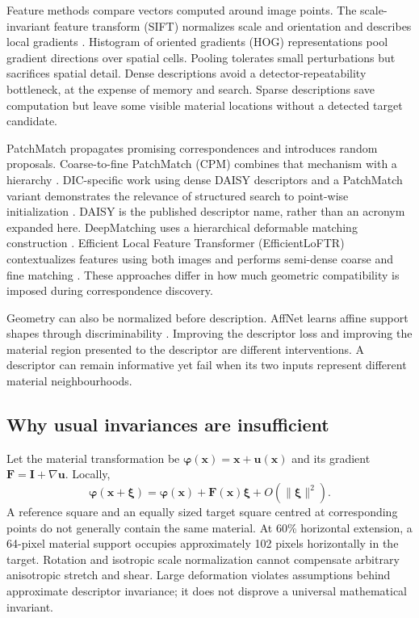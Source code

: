 \documentclass[11pt,a4paper]{article}
\newcommand{\uu}{\mathbf u}\newcommand{\xx}{\mathbf x}\newcommand{\FF}{\mathbf F}
\begin{document}
Feature methods compare vectors computed around image points. The scale-invariant feature transform (SIFT) normalizes scale and orientation and describes local gradients \citep{lowe}. Histogram of oriented gradients (HOG) representations pool gradient directions over spatial cells. Pooling tolerates small perturbations but sacrifices spatial detail. Dense descriptions avoid a detector-repeatability bottleneck, at the expense of memory and search. Sparse descriptions save computation but leave some visible material locations without a detected target candidate.

PatchMatch propagates promising correspondences and introduces random proposals. Coarse-to-fine PatchMatch (CPM) combines that mechanism with a hierarchy \citep{hu}. DIC-specific work using dense DAISY descriptors and a PatchMatch variant demonstrates the relevance of structured search to point-wise initialization \citep{li}. DAISY is the published descriptor name, rather than an acronym expanded here. DeepMatching uses a hierarchical deformable matching construction \citep{deepmatching}. Efficient Local Feature Transformer (EfficientLoFTR) contextualizes features using both images and performs semi-dense coarse and fine matching \citep{eloftr}. These approaches differ in how much geometric compatibility is imposed during correspondence discovery.

Geometry can also be normalized before description. AffNet learns affine support shapes through discriminability \citep{affnet}. Improving the descriptor loss and improving the material region presented to the descriptor are different interventions. A descriptor can remain informative yet fail when its two inputs represent different material neighbourhoods.

\subsection{Why usual invariances are insufficient}
Let the material transformation be $\boldsymbol\varphi(\xx)=\xx+\uu(\xx)$ and its gradient $\FF=\mathbf I+\nabla\uu$. Locally,
\begin{equation}
\boldsymbol\varphi(\xx+\boldsymbol\xi)=\boldsymbol\varphi(\xx)+\FF(\xx)\boldsymbol\xi+O(\|\boldsymbol\xi\|^2).
\end{equation}
A reference square and an equally sized target square centred at corresponding points do not generally contain the same material. At 60\% horizontal extension, a 64-pixel material support occupies approximately 102 pixels horizontally in the target. Rotation and isotropic scale normalization cannot compensate arbitrary anisotropic stretch and shear. Large deformation violates assumptions behind approximate descriptor invariance; it does not disprove a universal mathematical invariant.
\end{document}
